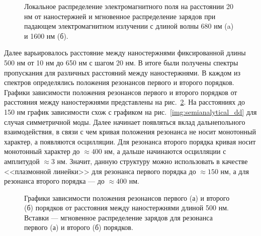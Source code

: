 \begin{figure}
\caption{Локальное распределение электромагнитного поля на расстоянии 20 нм от наностержней и мгновенное распределение зарядов при падающем электромагнитном излучении с длиной волны 680 нм (a) и 1600 нм (б).}
\label{img:locala500d100FDTD}
\end{figure}

Далее варьировалось расстояние между наностержнями фиксированной длины 500 нм от 10 нм до 650 нм с шагом 20 нм. В итоге были получены спектры пропускания для различных расстояний между наностержнями. В каждом из спектров определялись положения резонансов первого и второго порядков. Графики зависимости положения резонансов первого и второго порядков от расстояния между наностержнями представлены на рис.~\ref{img:a500PML}. На расстояниях до 150 нм график зависимости схож с графиком на рис.~\ref{img:semianalytical_dd} для случая симметричной моды. Далее начинает появляться вклад дальнепольного взаимодействия, в связи с чем кривая положения резонанса не носит монотонный характер, а появляются осцилляции. Для резонанса второго порядка кривая носит монотонный характер до $ \approx 400 $ нм, а дальше начинаются осцилляции с амплитудой $ \approx 3 $ нм. Значит, данную структуру можно использовать в качестве <<плазмонной линейки>> для резонанса первого порядка до $ \approx 150 $ нм, а для резонанса второго порядка --- до $ \approx 400 $ нм.

\begin{figure}
\caption{Графики зависимости положения  резонансов первого (а) и второго (б) порядков от расстояния между наностержнями длиной 500 нм. Вставки --- мгновенное распределение зарядов для резонанса первого (а) и второго (б) порядков.}
\label{img:a500PML}
\end{figure}

